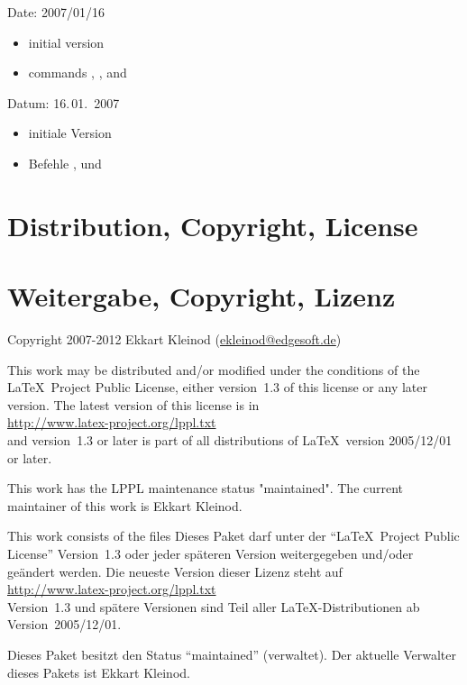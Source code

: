
\ifENGLISH
Date: 2007/01/16
\begin{itemize}
\item initial version
\item commands , , and 
\end{itemize}
\fi
\ifGERMAN
	Datum: 16.\,01.~2007
	\begin{itemize}
	\item initiale Version
	\item Befehle ,  und 
	\end{itemize}
\fi

\ifENGLISH
\section{Distribution, Copyright, License}
\fi
\ifGERMAN
	\section{Weitergabe, Copyright, Lizenz}
\fi

Copyright 2007-2012 Ekkart Kleinod (\href{mailto:ekleinod@edgesoft.de}{ekleinod@edgesoft.de})

\ifENGLISH
This work may be distributed and/or modified under the
conditions of the \LaTeX\ Project Public License, either version~1.3
of this license or any later version.
The latest version of this license is in\\
\url{http://www.latex-project.org/lppl.txt}\\
and version~1.3 or later is part of all distributions of \LaTeX\
version 2005/12/01 or later.

This work has the LPPL maintenance status "maintained".
The current maintainer of this work is Ekkart Kleinod.

This work consists of the files
\fi
\ifGERMAN
	Dieses Paket darf unter der "`\LaTeX\ Project Public License"' Version~1.3 oder jeder späteren Version weitergegeben und/oder geändert werden.
	Die neueste Version dieser Lizenz steht auf\\
	\url{http://www.latex-project.org/lppl.txt}\\
	Version~1.3 und spätere Versionen sind Teil aller \LaTeX-Distributionen ab Version~2005/12/01.

	Dieses Paket besitzt den Status "`maintained"' (verwaltet).
	Der aktuelle Verwalter dieses Pakets ist Ekkart Kleinod.

